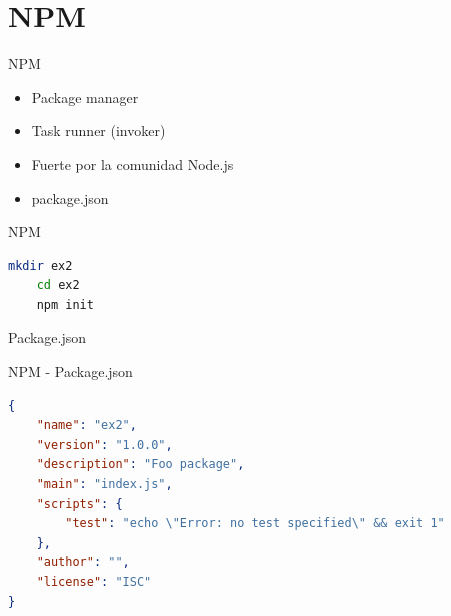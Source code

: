 \documentclass[aspectratio=169]{beamer}
\begin{document}
{
    \section{NPM}
}


\begin{frame}{NPM}
    \begin{itemize}
        \item Package manager
        \item Task runner (invoker)
        \item Fuerte por la comunidad Node.js
        \item package.json
    \end{itemize}
\end{frame}


\begin{frame}[fragile]{NPM}
    
    \begin{lstlisting}[language=bash]
    mkdir ex2
    cd ex2
    npm init
    \end{lstlisting}
    
    Package.json
    
\end{frame}

\begin{frame}[fragile]{NPM - Package.json}
\begin{lstlisting}[language=JSON]
{
    "name": "ex2",
    "version": "1.0.0",
    "description": "Foo package",
    "main": "index.js",
    "scripts": {
        "test": "echo \"Error: no test specified\" && exit 1"
    },
    "author": "",
    "license": "ISC"
}
\end{lstlisting}

\end{frame}
\end{document}

